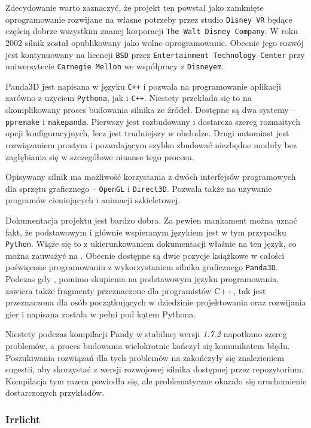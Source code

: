 \documentclass[11pt]{mwrep}
\begin{document}
      Zdecydowanie warto zaznaczyć, że projekt ten powstał jako zamknięte oprogramowanie rozwijane na własne potrzeby przez studio \texttt{Disney VR} będące częścią dobrze wszystkim znanej korporacji \texttt{The Walt Disney Company}. W roku 2002 silnik został opublikowany jako wolne oprogramowanie. Obecnie jego rozwój jest kontynuowany na licencji \texttt{BSD} przez \texttt{Entertainment Technology Center} przy uniwersytecie \texttt{Carnegie Mellon} we współpracy z \texttt{Disneyem}.

      Panda3D jest napisana w języku \texttt{C++} i pozwala na programowanie aplikacji zarówno z użyciem \texttt{Pythona}, jak i \texttt{C++}. Niestety przekłada się to na skomplikowany proces budowania silnika ze źródeł. Dostępne są dwa systemy -- \texttt{ppremake} i \texttt{makepanda}. Pierwszy jest rozbudowany i dostarcza szereg rozmaitych opcji konfiguracyjnych, lecz jest trudniejszy w obsłudze. Drugi natomiast jest rozwiązaniem prostym i pozwalającym szybko zbudować niezbędne moduły bez zagłębiania się w szczegółowe niuanse tego procesu.

      Opisywany silnik ma możliwość korzystania z dwóch interfejsów programowych dla sprzętu graficznego -- \texttt{OpenGL} i \texttt{Direct3D}. Pozwala także na używanie programów cieniujących i animacji szkieletowej.

     Dokumentacja projektu jest bardzo dobra. Za pewien mankament można uznać fakt, że podstawowym i głównie wspieranym językiem jest w tym przypadku \texttt{Python}. Wiąże się to z ukierunkowaniem dokumentacji właśnie na ten język, co można zauważyć na \cite{panda}. Obecnie dostępne są dwie pozycje książkowe w całości poświęcone programowaniu z wykorzystaniem silnika graficznego \texttt{Panda3D}. Podczas gdy \cite{pandab1}, pomimo skupienia na podstawowym języku programowania, zawiera także fragmenty przeznaczone dla programistów C++, tak \cite{pandab2} jest przeznaczona dla osób początkujących w dziedzinie projektowania oraz rozwijania gier i napisana została w pełni pod kątem Pythona.

      Niestety podczas kompilacji Pandy w stabilnej wersji \textit{1.7.2} napotkano szereg problemów, a proces budowania wielokrotnie kończył się komunikatem błędu. Poszukiwania rozwiązań dla tych problemów na \cite{pandaf} zakończyły się znalezieniem sugestii, aby skorzystać z wersji rozwojowej silnika dostępnej przez repozytorium. Kompilacja tym razem powiodła się, ale problematyczne okazało się uruchomienie dostarczonych przykładów. 
\pagebreak
      \subsubsection{Irrlicht}
\end{document}
